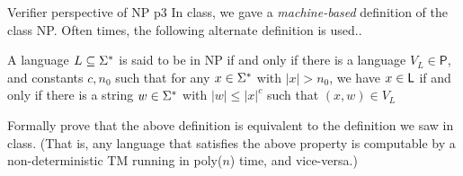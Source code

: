 \documentclass[a4paper, 11pt]{article}
\begin{document}
\begin{problem}{%
		Verifier perspective of \textsf{NP}
	}{p3%
	}
In class, we gave a \textit{machine-based} definition of the class \textsf{NP}. Often times, the following alternate definition is used..
\begin{center}
	\begin{minipage}{0.9\textwidth}
		A language $L\subseteq \Sigma^*$ is said to be in \textsf{NP} if and only if there is a language $V_L\in\textsf{P}$, and constants $c,n_0$ such that for any $x\in\Sigma^*$ with $|x|>n_0$, we have $x\in \textsf{L}$ if and only if there is a string $w\in\Sigma^*$ with $|w|\leq|x|^c$ such that $(x,w)\in V_L$
	\end{minipage}
\end{center}

Formally prove that the above definition is equivalent to the definition we saw in class. (That is, any language that satisfies the above property is computable by a non-deterministic TM running in poly($n$) time, and vice-versa.)

\end{problem}
\end{document}
